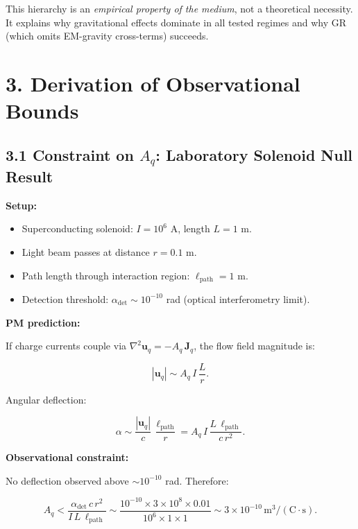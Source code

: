 \documentclass{article}
\begin{document}
This hierarchy is an \emph{empirical property of the medium}, not a theoretical
necessity. It explains why gravitational effects dominate in all tested regimes
and why GR (which omits EM-gravity cross-terms) succeeds.

\section*{3. Derivation of Observational Bounds}

\subsection*{3.1 Constraint on $A_q$: Laboratory Solenoid Null Result}

\textbf{Setup:}

\begin{itemize}
    \item Superconducting solenoid: $I = 10^6$ A, length $L = 1$ m.
    \item Light beam passes at distance $r = 0.1$ m.
    \item Path length through interaction region: $\ell_{\text{path}} = 1$ m.
    \item Detection threshold: $\alpha_{\text{det}} \sim 10^{-10}$ rad (optical interferometry limit).
\end{itemize}

\textbf{PM prediction:}

If charge currents couple via $\nabla^2\mathbf u_q = -A_q\,\mathbf J_q$, the
flow field magnitude is:



\[
|\mathbf u_q| \sim A_q\,I\,\frac{L}{r}.
\]



Angular deflection:



\[
\alpha \sim \frac{|\mathbf u_q|}{c}\,\frac{\ell_{\text{path}}}{r}
= A_q\,I\,\frac{L\,\ell_{\text{path}}}{c\,r^2}.
\]



\textbf{Observational constraint:}

No deflection observed above $\sim 10^{-10}$ rad. Therefore:



\[
A_q < \frac{\alpha_{\text{det}}\,c\,r^2}{I\,L\,\ell_{\text{path}}}
\sim \frac{10^{-10} \times 3 \times 10^8 \times 0.01}{10^6 \times 1 \times 1}
\sim 3 \times 10^{-10}\,\text{m}^3/(\text{C}\cdot\text{s}).
\]
\end{document}
